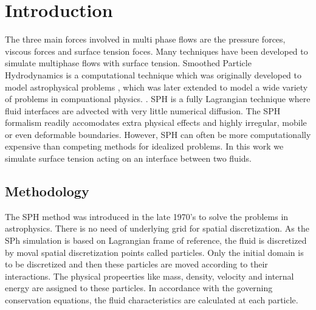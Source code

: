 
\newcommand{\etas}{\ensuremath{\eta_{\mathrm{s}}}}


\chapter{Introduction}

The three main forces involved in multi phase flows are the pressure forces, viscous forces and surface tension foces. Many techniques have been developed to simulate multiphase flows with surface tension. Smoothed Particle Hydrodynamics is a computational technique which was originally developed to model astrophysical problems \cite{Monaghan1977}, which was later extended to model a wide variety of problems in compuational physics. \cite{Monaghan1992, Monaghan1994}. SPH is a fully Lagrangian technique where fluid interfaces are advected with very little numerical diffusion. The SPH formalism readily accomodates extra physical effects and highly irregular, mobile or even deformable boundaries. However, SPH can often be more computationally expensive than competing methods for idealized problems. In this work we simulate surface tension acting on an interface between two fluids. 

\section{Methodology}

The SPH method was introduced in the late 1970's to solve the problems in astrophysics. There is no need of underlying grid for spatial discretization. As the SPh simulation is based on Lagrangian frame of reference, the fluid is discretized by moval spatial discretization points called particles. Only the initial domain is to be discretized and then these particles are moved according to their interactions. The physical propeerties like mass, density, velocity and internal energy are assigned to these particles. In accordance with the governing conservation equations, the fluid characteristics are calculated at each particle.

